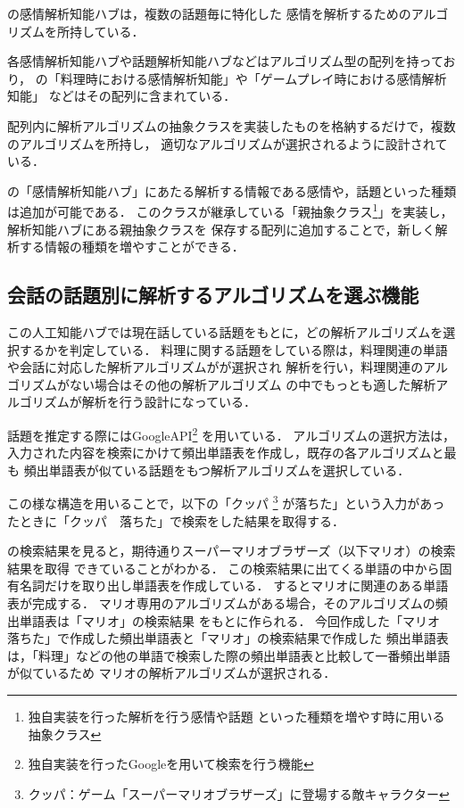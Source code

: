 
の感情解析知能ハブは，複数の話題毎に特化した
感情を解析するためのアルゴリズムを所持している．

各感情解析知能ハブや話題解析知能ハブなどはアルゴリズム型の配列を持っており，
の「料理時における感情解析知能」や「ゲームプレイ時における感情解析知能」
などはその配列に含まれている．

配列内に解析アルゴリズムの抽象クラスを実装したものを格納するだけで，複数のアルゴリズムを所持し，
適切なアルゴリズムが選択されるように設計されている．

の「感情解析知能ハブ」にあたる解析する情報である感情や，話題といった種類
は追加が可能である．
このクラスが継承している「親抽象クラス\footnote{独自実装を行った解析を行う感情や話題
といった種類を増やす時に用いる抽象クラス}」を実装し，解析知能ハブにある親抽象クラスを
保存する配列に追加することで，新しく解析する情報の種類を増やすことができる．

\subsection{会話の話題別に解析するアルゴリズムを選ぶ機能}
この人工知能ハブでは現在話している話題をもとに，どの解析アルゴリズムを選択するかを判定している．
料理に関する話題をしている際は，料理関連の単語や会話に対応した解析アルゴリズムがが選択され
解析を行い，料理関連のアルゴリズムがない場合はその他の解析アルゴリズム
の中でもっとも適した解析アルゴリズムが解析を行う設計になっている．

話題を推定する際にはGoogleAPI\footnote{独自実装を行ったGoogleを用いて検索を行う機能}
を用いている．
アルゴリズムの選択方法は，入力された内容を検索にかけて頻出単語表を作成し，既存の各アルゴリズムと最も
頻出単語表が似ている話題をもつ解析アルゴリズムを選択している．

この様な構造を用いることで，以下の「クッパ
	\footnote{クッパ：ゲーム「スーパーマリオブラザーズ」に登場する敵キャラクター}
が落ちた」という入力があったときに「クッパ　落ちた」で検索をした結果を取得する．


の検索結果を見ると，期待通りスーパーマリオブラザーズ（以下マリオ）の検索結果を取得
できていることがわかる．
この検索結果に出てくる単語の中から固有名詞だけを取り出し単語表を作成している．
するとマリオに関連のある単語表が完成する．
マリオ専用のアルゴリズムがある場合，そのアルゴリズムの頻出単語表は「マリオ」の検索結果
をもとに作られる．
今回作成した「マリオ　落ちた」で作成した頻出単語表と「マリオ」の検索結果で作成した
頻出単語表は，「料理」などの他の単語で検索した際の頻出単語表と比較して一番頻出単語が似ているため
マリオの解析アルゴリズムが選択される．

